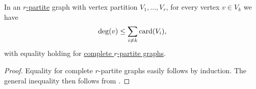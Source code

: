 \begin{lemma}\label{thm:multipartite_graph_degree}
  In an \hyperref[def:multipartite_graph]{\( r \)-partite} graph with vertex partition \( V_1, \ldots, V_r \), for every vertex \( v \in V_k \) we have
  \begin{equation*}
    \deg(v) \leq \sum_{i \neq k} \operatorname{card}(V_i),
  \end{equation*}
  with equality holding for \hyperref[def:complete_multipartite_graph]{complete \( r \)-partite graphs}.
\end{lemma}
\begin{proof}
  Equality for complete \( r \)-partite graphs easily follows by induction. The general inequality then follows from .
\end{proof}

